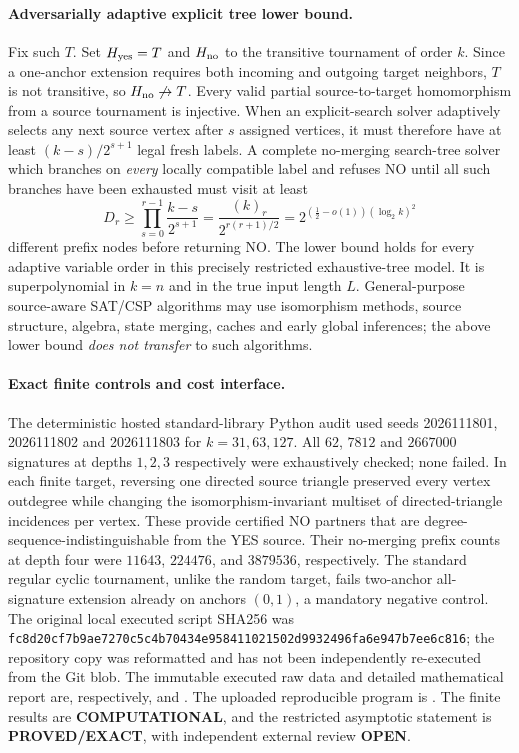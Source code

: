 \documentclass[11pt]{article}
\begin{document}
\paragraph{Adversarially adaptive explicit tree lower bound.}
Fix such $T$. Set $H_{\rm yes}=T$ and
$H_{\rm no}$ to the transitive tournament of order $k$.
Since a one-anchor extension requires both incoming and
outgoing target neighbors, $T$ is not transitive, so
$H_{\rm no}\not\to T$. Every valid partial source-to-target
homomorphism from a source tournament is injective.
When an explicit-search solver adaptively selects any next
source vertex after $s$ assigned vertices, it must therefore
have at least $(k-s)/2^{s+1}$ legal fresh labels.
A complete no-merging search-tree solver which branches on
\emph{every} locally compatible label and refuses NO until
all such branches have been exhausted must visit at least
\[
D_r\ge\prod_{s=0}^{r-1}\frac{k-s}{2^{s+1}}
=\frac{(k)_r}{2^{r(r+1)/2}}
=2^{(\frac12-o(1))(\log_2 k)^2}
\]
different prefix nodes before returning NO.
The lower bound holds for every adaptive variable order in
this precisely restricted exhaustive-tree model. It is
superpolynomial in $k=n$ and in the true input length $L$.
General-purpose source-aware SAT/CSP algorithms may use
isomorphism methods, source structure, algebra, state merging,
caches and early global inferences; the above lower bound
\emph{does not transfer} to such algorithms.

\paragraph{Exact finite controls and cost interface.}
The deterministic hosted standard-library Python audit used
seeds 2026111801, 2026111802 and 2026111803 for $k=31,63,127$.
All $62$, $7812$ and $2667000$ signatures at depths $1,2,3$
respectively were exhaustively checked; none failed.
In each finite target, reversing one directed source triangle
preserved every vertex outdegree while changing the
isomorphism-invariant multiset of directed-triangle incidences
per vertex. These provide certified NO partners that are
degree-sequence-indistinguishable from the YES source.
Their no-merging prefix counts at depth four were
$11643$, $224476$, and $3879536$, respectively.
The standard regular cyclic tournament, unlike the random
target, fails two-anchor all-signature extension already
on anchors $(0,1)$, a mandatory negative control.
The original local executed script SHA256 was
\texttt{fc8d20cf7b9ae7270c5c4b70434e958411021502d9932496fa6e947b7ee6c816};
the repository copy was reformatted and has not been
independently re-executed from the Git blob.
The immutable executed raw data and detailed mathematical
report are, respectively,
and
.
The uploaded reproducible program is
.
The finite results are \textbf{COMPUTATIONAL}, and the
restricted asymptotic statement is \textbf{PROVED/EXACT},
with independent external review \textbf{OPEN}.
\end{document}

